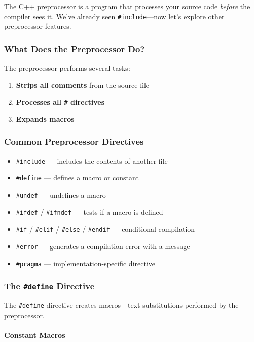 The C++ preprocessor is a program that processes your source code \textit{before} the compiler sees it. We've already seen \texttt{\#include}—now let's explore other preprocessor features.

\subsubsection{What Does the Preprocessor Do?}

The preprocessor performs several tasks:

\begin{enumerate}
	\item \textbf{Strips all comments} from the source file
	\item \textbf{Processes all \texttt{\#} directives}
	\item \textbf{Expands macros}
\end{enumerate}

\subsubsection{Common Preprocessor Directives}

\begin{itemize}
	\item \texttt{\#include} — includes the contents of another file
	\item \texttt{\#define} — defines a macro or constant
	\item \texttt{\#undef} — undefines a macro
	\item \texttt{\#ifdef} / \texttt{\#ifndef} — tests if a macro is defined
	\item \texttt{\#if} / \texttt{\#elif} / \texttt{\#else} / \texttt{\#endif} — conditional compilation
	\item \texttt{\#error} — generates a compilation error with a message
	\item \texttt{\#pragma} — implementation-specific directive
\end{itemize}

\subsubsection{The \texttt{\#define} Directive}

The \texttt{\#define} directive creates macros—text substitutions performed by the preprocessor.

\paragraph{Constant Macros}

